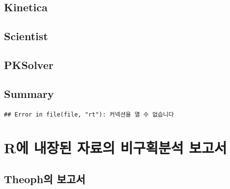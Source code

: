 \documentclass[12pt,]{krantz}
\begin{document}
\hypertarget{kinetica}{%
\section{Kinetica}\label{kinetica}}

\hypertarget{scientist}{%
\section{Scientist}\label{scientist}}

\hypertarget{pksolver}{%
\section{PKSolver}\label{pksolver}}

\hypertarget{summary}{%
\section{Summary}\label{summary}}

\begin{verbatim}
## Error in file(file, "rt"): 커넥션을 열 수 없습니다
\end{verbatim}

\hypertarget{groupreport}{%
\chapter{R에 내장된 자료의 비구획분석 보고서}\label{groupreport}}

\hypertarget{theophgroup}{%
\section{Theoph의 보고서}\label{theophgroup}}
\end{document}
